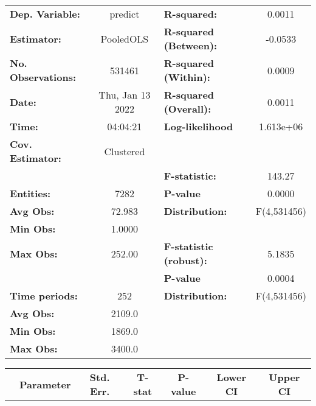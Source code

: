 \begin{center}
\begin{tabular}{lclc}
\toprule
\textbf{Dep. Variable:}    &      predict       & \textbf{  R-squared:         }   &      0.0011      \\
\textbf{Estimator:}        &     PooledOLS      & \textbf{  R-squared (Between):}  &     -0.0533      \\
\textbf{No. Observations:} &       531461       & \textbf{  R-squared (Within):}   &      0.0009      \\
\textbf{Date:}             &  Thu, Jan 13 2022  & \textbf{  R-squared (Overall):}  &      0.0011      \\
\textbf{Time:}             &      04:04:21      & \textbf{  Log-likelihood     }   &    1.613e+06     \\
\textbf{Cov. Estimator:}   &     Clustered      & \textbf{                     }   &                  \\
\textbf{}                  &                    & \textbf{  F-statistic:       }   &      143.27      \\
\textbf{Entities:}         &        7282        & \textbf{  P-value            }   &      0.0000      \\
\textbf{Avg Obs:}          &       72.983       & \textbf{  Distribution:      }   &   F(4,531456)    \\
\textbf{Min Obs:}          &       1.0000       & \textbf{                     }   &                  \\
\textbf{Max Obs:}          &       252.00       & \textbf{  F-statistic (robust):} &      5.1835      \\
\textbf{}                  &                    & \textbf{  P-value            }   &      0.0004      \\
\textbf{Time periods:}     &        252         & \textbf{  Distribution:      }   &   F(4,531456)    \\
\textbf{Avg Obs:}          &       2109.0       & \textbf{                     }   &                  \\
\textbf{Min Obs:}          &       1869.0       & \textbf{                     }   &                  \\
\textbf{Max Obs:}          &       3400.0       & \textbf{                     }   &                  \\
\bottomrule
\end{tabular}
\begin{tabular}{lcccccc}
                & \textbf{Parameter} & \textbf{Std. Err.} & \textbf{T-stat} & \textbf{P-value} & \textbf{Lower CI} & \textbf{Upper CI}  \\

\end{tabular}
\end{center}
